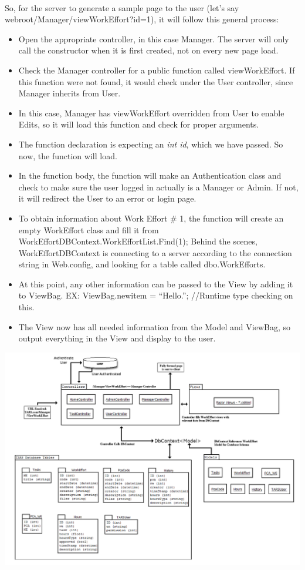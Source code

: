 \documentclass[letterpaper]{article}
\begin{document}
\paragraph{}
So, for the server to generate a sample page to the user (let's say webroot/Manager/viewWorkEffort?id=1), it will follow this general process:
\begin{itemize}
\item Open the appropriate controller, in this case Manager. The server will only call the constructor when it is first created, not on every new page load.
\item Check the Manager controller for a public function called viewWorkEffort. If this function were not found, it would check under the User controller, since Manager inherits from User.
\item In this case, Manager has viewWorkEffort overridden from User to enable Edits, so it will load this function and check for proper arguments. 
\item The function declaration is expecting an \emph{int id}, which we have passed. So now, the function will load.
\item In the function body, the function will make an Authentication class and check to make sure the user logged in actually is a Manager or Admin. If not, it will redirect the User to an error or login page.
\item To obtain information about Work Effort \# 1, the function will create an empty WorkEffort class and fill it from WorkEffortDBContext.WorkEffortList.Find(1); Behind the scenes, WorkEffortDBContext is connecting to a server according to the connection string in Web.config, and looking for a table called dbo.WorkEfforts.
\item At this point, any other information can be passed to the View by adding it to ViewBag. EX: ViewBag.newitem = ``Hello.'';  //Runtime type checking on this.
\item The View now has all needed information from the Model and ViewBag, so output everything in the View and display to the user.
\end{itemize}
\begin{centering}
\includegraphics[scale=0.6]{erd_flow.png}
\end{centering}
\pagebreak
\end{document}
